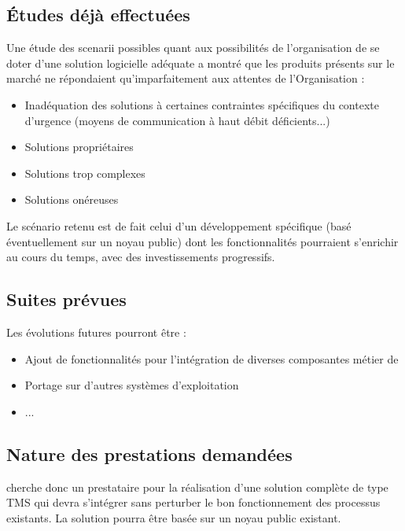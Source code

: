 \subsection{Études déjà effectuées}
Une étude des scenarii possibles quant aux possibilités de l'organisation de se doter d'une solution logicielle adéquate a montré que les produits présents sur le marché ne répondaient qu'imparfaitement aux attentes de l'Organisation :
\begin{itemize}
\item Inadéquation des solutions à certaines contraintes spécifiques du contexte d'urgence (moyens de communication à haut débit déficients...)
\item Solutions propriétaires
\item Solutions trop complexes
\item Solutions onéreuses
\end{itemize}
Le scénario retenu est de fait celui d'un développement spécifique (basé éventuellement sur un noyau public) dont les fonctionnalités pourraient s'enrichir au cours du temps, avec des investissements progressifs.

\subsection{Suites prévues}
Les évolutions futures pourront être :
\begin{itemize}
	\item Ajout de fonctionnalités pour l'intégration de diverses composantes métier de \mo
	\item Portage sur d'autres systèmes d'exploitation
	\item ...
\end{itemize}

\subsection{Nature des prestations demandées}
\mo cherche donc un prestataire pour la réalisation d'une solution complète de type TMS qui devra s'intégrer sans perturber le bon fonctionnement des processus existants. La solution pourra être basée sur un noyau public existant.

